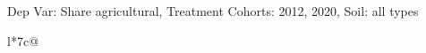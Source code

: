 \begin{table}[H]
\captionlistentry[table]{}
\label{table:beaver_land_class_DVis_land_class_1_SCg13_SSall_soil}
\scriptsize %
Dep Var: Share agricultural, Treatment Cohorts: 2012, 2020, Soil: all types \\
\begin{threeparttable}
\begin{tabulary}{\textwidth}{l*{7}{c}@{}}
\toprule \toprule
\noalign{\smallskip}
\noalign{\smallskip}
\midrule \bottomrule
\end{tabulary}
\medskip
\end{threeparttable}
\end{table}
